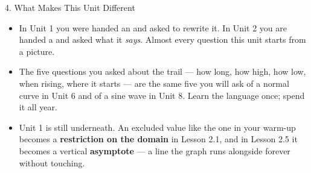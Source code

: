 \documentclass[10pt]{article}
\begin{document}
\vspace{0.10in}

\boxguard
\begin{notesbox}{4. What Makes This Unit Different}
\small
\begin{itemize}[leftmargin=1.3em, itemsep=3pt, topsep=3pt]
  \item In Unit 1 you were handed an  and asked to rewrite it. In Unit 2 you are
        handed a  and asked what it \emph{says}. Almost every question this unit
        starts from a picture.
  \item The five questions you asked about the trail --- how long, how high, how low, when
        rising, where it starts --- are the same five you will ask of a normal curve in Unit 6 and
        of a sine wave in Unit 8. Learn the language once; spend it all year.
  \item Unit 1 is still underneath. An excluded value like the one in your warm-up becomes a
        \textbf{restriction on the domain} in Lesson 2.1, and in Lesson 2.5 it becomes a vertical
        \textbf{asymptote} --- a line the graph runs alongside forever without touching.
\end{itemize}
\end{notesbox}

\vspace{0.10in}
\end{document}
